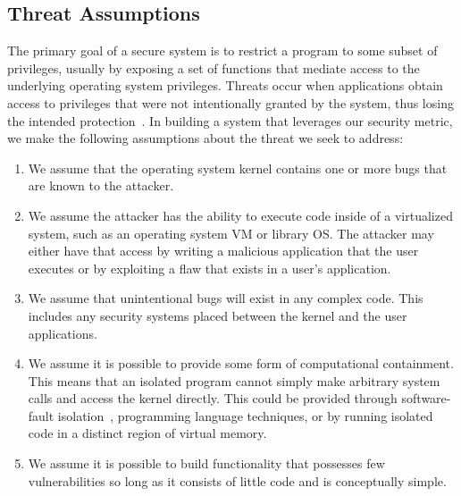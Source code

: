 
\subsection{Threat Assumptions}

The primary goal of a secure system is to restrict a program to some subset
of privileges, 
usually by exposing a set of functions that mediate access to the
underlying operating system privileges. 
Threats occur when applications obtain access to privileges that were not
intentionally granted by the system, 
thus losing the intended protection~\cite{Repy-10}. In building a system
that leverages our security metric, 
we make the following assumptions about the threat we seek to address:

\begin{enumerate}
\item We assume that the operating system kernel contains one or more bugs 
that are known to the attacker.

\item We assume the attacker has the ability to execute code inside
of a virtualized system, such as an operating system VM or library OS.
The attacker may either have that access by writing a malicious application
that the user executes or by exploiting a flaw that exists in a user's
application.


\item We assume that unintentional bugs will exist in any complex code.  This
includes any security systems placed between the kernel and the user
applications.

\item We assume it is possible to provide some form of computational 
containment.  This means that an isolated program cannot simply
make arbitrary system calls and access the kernel directly.  This could
be provided through software-fault isolation~\cite{SFI:93}, programming 
language techniques, or by running isolated code in a
distinct region of virtual memory.

\item We assume it is possible to build functionality that possesses few
vulnerabilities so long as it consists of little code and is conceptually 
simple.

\end{enumerate}

